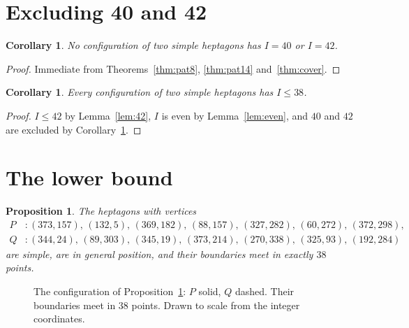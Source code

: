 \documentclass[11pt,a4paper]{article}
\theoremstyle{plain}
\newtheorem{proposition}[theorem]{Proposition}
\newtheorem{corollary}[theorem]{Corollary}
\theoremstyle{definition}
\theoremstyle{remark}
\begin{document}
\section{Excluding 40 and 42}\label{sec:exclude}

\begin{corollary}\label{cor:not4042}
No configuration of two \emph{simple} heptagons has $I=40$ or $I=42$.
\end{corollary}

\begin{proof}
Immediate from Theorems~\ref{thm:pat8}, \ref{thm:pat14} and~\ref{thm:cover}.
\end{proof}

\begin{corollary}\label{cor:38}
Every configuration of two \emph{simple} heptagons has $I\le 38$.
\end{corollary}

\begin{proof}
$I\le42$ by Lemma~\ref{lem:42}, $I$ is even by Lemma~\ref{lem:even}, and $40$
and $42$ are excluded by Corollary~\ref{cor:not4042}.
\end{proof}

\section{The lower bound}\label{sec:lower}

\begin{proposition}\label{prop:lower}
The heptagons with vertices
\[
\begin{aligned}
P &: (373,157),\,(132,5),\,(369,182),\,(88,157),\,(327,282),\,(60,272),\,(372,298),\\
Q &: (344,24),\,(89,303),\,(345,19),\,(373,214),\,(270,338),\,(325,93),\,(192,284)
\end{aligned}
\]
are simple, are in general position, and their boundaries meet in exactly $38$
points.
\end{proposition}

\begin{figure}[ht]
\centering
{}
\caption{The configuration of Proposition~\ref{prop:lower}: $P$ solid, $Q$
dashed. Their boundaries meet in $38$ points. Drawn to scale from the integer
coordinates.}\label{fig:cert}
\end{figure}
\end{document}
